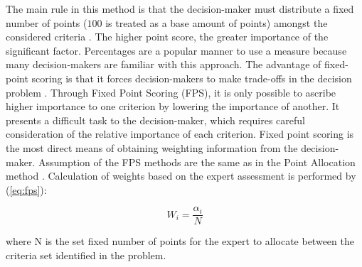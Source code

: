 The main rule in this method is that the decision-maker must distribute a fixed number of points ($100$ is treated as a base amount of points) amongst the considered criteria \cite{hajkowicz2000evaluation}. The higher point score, the greater importance of the significant factor. Percentages are a popular manner to use a measure because many decision-makers are familiar with this approach. The advantage of fixed-point scoring is that it forces decision-makers to make trade-offs in the decision problem \cite{odu2019weighting}. Through Fixed Point Scoring (FPS), it is only possible to ascribe higher importance to one criterion by lowering the importance of another. It presents a difficult task to the decision-maker, which requires careful consideration of the relative importance of each criterion. Fixed point scoring is the most direct means of obtaining weighting information from the decision-maker. Assumption of the FPS methods are the same as in the Point Allocation method \cite{zardari2015weighting}. Calculation of weights based on the expert assessment is performed by (\ref{eq:fps}):

\begin{equation}
    W_i=\frac{\alpha_{i}}{N}
    \label{eq:fps}
\end{equation}

where N is the set fixed number of points for the expert to allocate between the criteria set identified in the problem.
